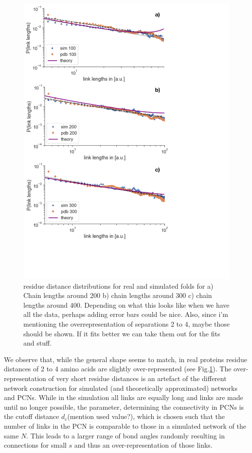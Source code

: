 \documentclass[
reprint,
twocolumn,
amsmath,amssymb,superscriptaddress,aps,
pre]{revtex4-1}
\newcommand{\red}[1]{\textcolor{red!80!black}{#1}}
\newcommand{\blue}[1]{\textcolor{blue!80!black}{#1}}
\begin{document}
\begin{figure}[t]
        \centering
    \includegraphics[width=\columnwidth]{paper/figures/Fig3/Fig3.pdf}
        \caption{residue distance distributions for real and simulated folds for a) Chain lengths around 200 b) chain lengths around 300 c) chain lengths around 400. \red{Depending on what this looks like when we have all the data, perhaps adding error bars could be nice. Also, since i'm mentioning the overrepresentation of separations 2 to 4, maybe those should be shown. If it fits better we can take them out for the fits and stuff.}
        }
        \label{fig:sdd}
\end{figure}

We observe that, while the general shape seems to match, in real proteins residue distances of 2 to 4 amino acids are slightly over-represented (see Fig.\ref{fig:sdd}).
The over-representation of very short residue distances is an artefact of the different network construction for simulated (and theoretically approximated) networks and PCNs. While in the simulation all links are equally long and links are made until no longer possible, the parameter, determining the connectivity in PCNs is the cutoff distance $d_c$\blue{(mention used value?)}, which is chosen such that the number of links in the PCN is comparable to those in a simulated network of the same $N$. This leads to a larger range of bond angles randomly resulting in connections for small $s$ and thus an over-representation of those links.
\end{document}
